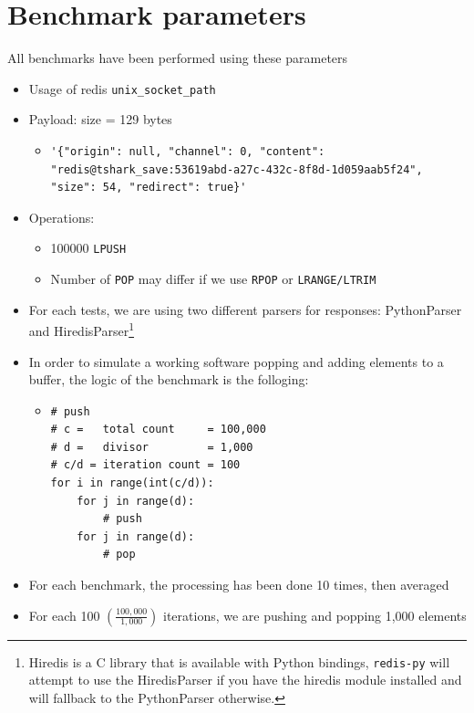 \documentclass[a4paper, 11pt]{report}
\begin{document}
\section{Benchmark parameters}
All benchmarks have been performed using these parameters
\begin{itemize}
    \item Usage of redis \texttt{unix\_socket\_path}
    \item Payload: size = 129 bytes
        \begin{itemize}
            \item[]
                \begin{lstlisting}
'{"origin": null, "channel": 0, "content": "redis@tshark_save:53619abd-a27c-432c-8f8d-1d059aab5f24", "size": 54, "redirect": true}'
\end{lstlisting}
        \end{itemize}
    \item Operations:
        \begin{itemize}
            \item 100000 \texttt{LPUSH}
            \item Number of \texttt{POP} may differ if we use \texttt{RPOP} or \texttt{LRANGE/LTRIM}
        \end{itemize}
    \item For each tests, we are using two different parsers for responses: PythonParser and HiredisParser\footnote{Hiredis is a C library that is available with Python bindings, \texttt{redis-py} will attempt to use the HiredisParser if you have the hiredis module installed and will fallback to the PythonParser otherwise.}
    \item In order to simulate a working software popping and adding elements to a buffer, the logic of the benchmark is the folloging:
        \begin{itemize}
            \item[] \begin{lstlisting}
# push
# c =   total count     = 100,000
# d =   divisor         = 1,000
# c/d = iteration count = 100
for i in range(int(c/d)):
    for j in range(d):
        # push
    for j in range(d):
        # pop
\end{lstlisting}
        \end{itemize}
        \item For each benchmark, the processing has been done 10 times, then averaged
        \item For each 100 $\left(\frac{100,000}{1,000}\right)$ iterations, we are pushing and popping 1,000 elements
\end{itemize}
\end{document}
